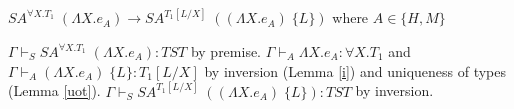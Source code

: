 \begin{case}
$SA^{\forall X.T_{1}}\;(\Lambda X.e_{A})\rightarrow SA^{T_{1}[L/X]}\;((\Lambda X.e_{A})\;\lbrace L\rbrace)$ where $A\in\lbrace H,M\rbrace$

$\Gamma\vdash_{S}SA^{\forall X.T_{1}}\;(\Lambda X.e_{A}):TST$ by premise.  $\Gamma\vdash_{A}\Lambda X.e_{A}:\forall X.T_{1}$ and $\Gamma\vdash_{A}(\Lambda X.e_{A})\;\lbrace L\rbrace:T_{1}[L/X]$ by inversion (Lemma \ref{i}) and uniqueness of types (Lemma \ref{uot}).  $\Gamma\vdash_{S}SA^{T_{1}[L/X]}\;((\Lambda X.e_{A})\;\lbrace L\rbrace):TST$ by inversion.
\end{case}
